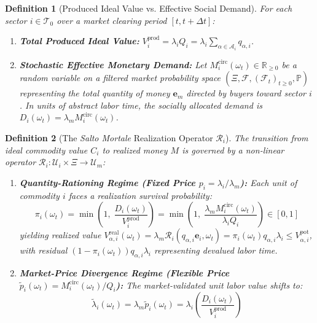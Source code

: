 \documentclass[11pt,a4paper]{article}
\newtheorem{definition}{Definition}[section]
\begin{document}
\begin{definition}[Produced Ideal Value vs. Effective Social Demand]
For each sector $i \in \mathcal{T}_0$ over a market clearing period $[t, t+\Delta t]$:
\begin{enumerate}[label=(\roman*)]
    \item \textbf{Total Produced Ideal Value:} $V^{\text{prod}}_i = \lambda_i Q_i = \lambda_i \sum_{\alpha \in \mathcal{A}_i} q_{\alpha, i}$.
    \item \textbf{Stochastic Effective Monetary Demand:} Let $M^{\text{circ}}_i(\omega_t) \in \mathbb{R}_{\ge 0}$ be a random variable on a filtered market probability space $(\Xi, \mathcal{F}, (\mathcal{F}_t)_{t \ge 0}, \mathbb{P})$ representing the total quantity of money $\mathbf{e}_m$ directed by buyers toward sector $i$. In units of abstract labor time, the socially allocated demand is $D_i(\omega_t) = \lambda_m M^{\text{circ}}_i(\omega_t)$.
\end{enumerate}
\end{definition}

\begin{definition}[The \textit{Salto Mortale} Realization Operator $\mathcal{R}_i$]
The transition from ideal commodity value $C_i$ to realized money $M$ is governed by a non-linear operator $\mathcal{R}_i: \mathcal{U}_i \times \Xi \to \mathcal{U}_m$:
\begin{enumerate}[label=(\arabic*)]
    \item \textbf{Quantity-Rationing Regime (Fixed Price $p_i = \lambda_i / \lambda_m$):} Each unit of commodity $i$ faces a realization survival probability:
    \begin{equation}
        \pi_i(\omega_t) = \min\!\left(1, \; \frac{D_i(\omega_t)}{V^{\text{prod}}_i}\right) = \min\!\left(1, \; \frac{\lambda_m M^{\text{circ}}_i(\omega_t)}{\lambda_i Q_i}\right) \in [0, 1]
    \end{equation}
    yielding realized value $V^{\text{real}}_{\alpha, i}(\omega_t) = \lambda_m \mathcal{R}_i(q_{\alpha, i}\mathbf{e}_i, \omega_t) = \pi_i(\omega_t) q_{\alpha, i} \lambda_i \le V^{\text{pot}}_{\alpha, i}$, with residual $(1 - \pi_i(\omega_t)) q_{\alpha, i} \lambda_i$ representing devalued labor time.
    \item \textbf{Market-Price Divergence Regime (Flexible Price $\tilde{p}_i(\omega_t) = M^{\text{circ}}_i(\omega_t) / Q_i$):} The market-validated unit labor value shifts to:
    \begin{equation}
        \tilde{\lambda}_i(\omega_t) = \lambda_m \tilde{p}_i(\omega_t) = \lambda_i \left(\frac{D_i(\omega_t)}{V^{\text{prod}}_i}\right)
    \end{equation}
\end{enumerate}
\end{definition}
\end{document}
